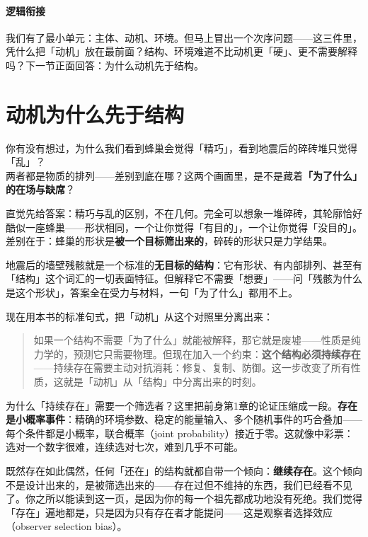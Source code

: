 \documentclass[../../main2.tex]{subfiles}
\begin{document}
	\paragraph*{逻辑衔接}
	我们有了最小单元：主体、动机、环境。但马上冒出一个次序问题——这三件里，凭什么把「动机」放在最前面？结构、环境难道不比动机更「硬」、更不需要解释吗？下一节正面回答：为什么动机先于结构。

	\section{动机为什么先于结构}
	\label{sec:mot-structure}

	\begin{readingnote}
		你有没有想过，为什么我们看到蜂巢会觉得「精巧」，看到地震后的碎砖堆只觉得「乱」？\\
		两者都是物质的排列——差别到底在哪？这两个画面里，是不是藏着\textbf{「为了什么」的在场与缺席}？
	\end{readingnote}

	直觉先给答案：精巧与乱的区别，不在几何。完全可以想象一堆碎砖，其轮廓恰好酷似一座蜂巢——形状相同，一个让你觉得「有目的」，一个让你觉得「没目的」。差别在于：蜂巢的形状是\textbf{被一个目标筛出来的}，碎砖的形状只是力学结果。

	地震后的墙壁残骸就是一个标准的\textbf{无目标的结构}：它有形状、有内部排列、甚至有「结构」这个词汇的一切表面特征。但解释它不需要「想要」——问「残骸为什么是这个形状」，答案全在受力与材料，一句「为了什么」都用不上。

	现在用本书的标准句式，把「动机」从这个对照里分离出来：

	\begin{quote}
		如果一个结构不需要「为了什么」就能被解释，那它就是废墟——性质是纯力学的，预测它只需要物理。但现在加入一个约束：\textbf{这个结构必须持续存在}——持续存在需要主动对抗消耗：修复、复制、防御。这一步改变了所有性质，这就是「动机」从「结构」中分离出来的时刻。
	\end{quote}

	为什么「持续存在」需要一个筛选者？这里把前身第1章的论证压缩成一段。\textbf{存在是小概率事件}：精确的环境参数、稳定的能量输入、多个随机事件的巧合叠加——每个条件都是小概率，联合概率（joint probability）接近于零。这就像中彩票：选对一个数字很难，连续选对七次，难到几乎不可能。

	既然存在如此偶然，任何「还在」的结构就都自带一个倾向：\textbf{继续存在}。这个倾向不是设计出来的，是被筛选出来的——存在过但不维持的东西，我们已经看不见了。你之所以能读到这一页，是因为你的每一个祖先都成功地没有死绝。我们觉得「存在」遍地都是，只是因为只有存在者才能提问——这是观察者选择效应（observer selection bias）。
\end{document}
